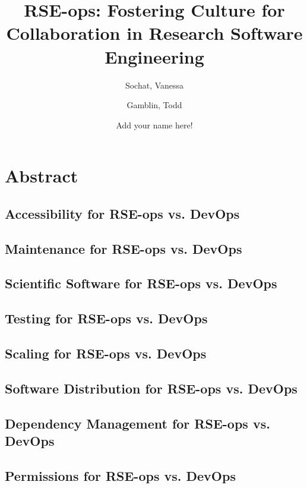 \documentclass{article}
\title{RSE-ops: Fostering Culture for Collaboration in Research Software Engineering}
\author{
  Sochat, Vanessa\\
  \and
  Gamblin, Todd\\
  \and
  Add your name here!
}
\begin{document}
\maketitle

\section{Abstract}







\subsection{Accessibility for RSE-ops vs. DevOps}


\subsection{Maintenance for RSE-ops vs. DevOps}


\subsection{Scientific Software for RSE-ops vs. DevOps}


\subsection{Testing for RSE-ops vs. DevOps}


\subsection{Scaling for RSE-ops vs. DevOps}


\subsection{Software Distribution for RSE-ops vs. DevOps}


\subsection{Dependency Management for RSE-ops vs. DevOps}


\subsection{Permissions for RSE-ops vs. DevOps}

\end{document}

